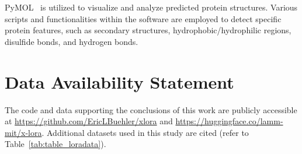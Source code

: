 PyMOL~\cite{Schrodinger2015The1.8} is utilized to visualize and analyze predicted protein structures. Various scripts and functionalities within the software are employed to detect specific protein features, such as secondary structures, hydrophobic/hydrophilic regions, disulfide bonds, and hydrogen bonds.

\section*{Data Availability Statement} The code and data supporting the conclusions of this work are publicly accessible at \url{https://github.com/EricLBuehler/xlora} and \url{https://huggingface.co/lamm-mit/x-lora}. Additional datasets used in this study are cited (refer to Table~\ref{tab:table_loradata}). 

